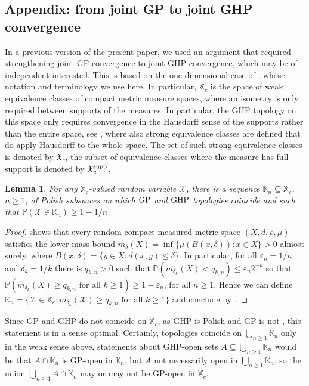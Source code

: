 \documentclass[11pt,a4paper]{article}
\newtheorem{lm}[prop]{Lemma}
\newcommand{\bP}{\mathbb{P}}
\newcommand{\bK}{\mathbb{K}}
\newcommand{\bX}{\mathbb{X}}
\newcommand{\cX}{\mathcal{X}}
\begin{document}
\begin{appendix}

\section{Appendix: from joint GP to joint GHP convergence}\label{appA}

In a previous version of the present paper, we used an argument that required strengthening joint GP convergence to joint GHP convergence, which may be of independent
interested. This is based on the one-dimensional case of \cite{ALW16}, whose notation and terminology we use here. In particular, $\bX_c$ is the space of weak
equivalence classes of compact metric measure spaces, where an isometry is only required between supports of the measures. In particular, the GHP topology on this space
only requires convergence in the Hausdorff sense of the supports rather than the entire space, see \cite[Section 5]{ALW16}, where also strong equivalence classes are
defined that do apply Hausdorff to the whole space. The set of such strong equivalence classes is denoted by $\mathfrak{X}_c$, the subset of equivalence classes where
the measure has full support is denoted by $\mathfrak{X}_c^{\rm supp}$.

\begin{lm} For any $\bX_c$-valued random variable $\cX$, there is a sequence $\bK_n\subseteq\bX_c$, $n\ge 1$, of Polish subspaces on which ${\rm GP}$ and ${\rm GHP}$ topologies coincide
  and such that $\bP(\cX\in\bK_n)\ge 1-1/n$.
\end{lm}
\begin{proof} \cite[Lemma 3.4]{ALW16} shows that every random compact measured metric space $(X,d,\rho,\mu)$ satisfies the lower mass bound $m_\delta(X)=\inf\{\mu(B(x,\delta))\colon x\in X\}>0$ almost surely, where $B(x,\delta)=\{y\in X\colon d(x,y)\le\delta\}$. In particular, for all $\varepsilon_n=1/n$ and $\delta_k=1/k$ there is $q_{k,n}>0$ such that $\bP(m_{\delta_k}(X)<q_{k,n})\le\varepsilon_n2^{-k}$ so that
$\bP(m_{\delta_k}(X) \ge q_{k,n}\mbox{ for all }k\ge 1)\ge 1-\varepsilon_n$, for all $n\ge 1$. Hence we can define $\bK_n=\{\cX\in\bX_c\colon m_{\delta_k}(\cX) \ge q_{k,n}\mbox{ for all }k\ge 1\}$ and conclude by \cite[Corollary 6.3]{ALW16}.
\end{proof}

Since GP and GHP do not coincide on $\bX_c$, as GHP is Polish and GP is not \cite{ALW16}, this statement is in a sense optimal. Certainly, topologies coincide on $\bigcup_{n\ge 1}\bK_n$ only in the weak sense above, statements about GHP-open sets $A\subseteq\bigcup_{n\ge 1}\bK_n$ would be that $A\cap\bK_n$ is GP-open in $\bK_n$, but $A$ not necessarily open in $\bigcup_{n\ge 1}\bK_n$, so the union $\bigcup_{n\ge 1}A\cap\bK_n$ may or may not be GP-open in $\bX_c$.


\end{appendix}
\end{document}
